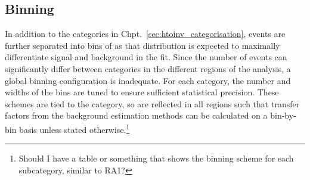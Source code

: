 







\subsection{Binning}
\label{subsec:htoinv_binning}

In addition to the categories in Chpt.~\ref{sec:htoinv_categorisation}, events are further separated into bins of \ptmiss as that distribution is expected to maximally differentiate signal and background in the fit. Since the number of events can significantly differ between categories in the different regions of the analysis, a global binning configuration is inadequate. For each category, the number and widths of the bins are tuned to ensure sufficient statistical precision. These schemes are tied to the category, so are reflected in all regions such that transfer factors from the background estimation methods can be calculated on a bin-by-bin basis unless stated otherwise.\footnote{Should I have a table or something that shows the binning scheme for each subcategory, similar to RA1?}



